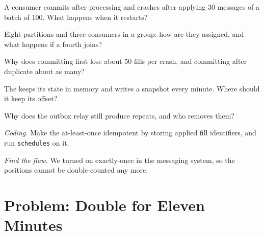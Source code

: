 \begin{exercise}[$\star$]\label{exo:pl:messaging-and-event-driven-architecture:2}
A consumer commits after processing and crashes after applying 30 messages of a batch of 100. What happens when it restarts?
\end{exercise}

\begin{exercise}[$\star$]\label{exo:pl:messaging-and-event-driven-architecture:3}
Eight partitions and three consumers in a group: how are they assigned, and what happens if a fourth joins?
\end{exercise}

\begin{exercise}[$\star\star$]\label{exo:pl:messaging-and-event-driven-architecture:4}
Why does committing first lose about 50 fills per crash, and committing after duplicate about as many?
\end{exercise}

\begin{exercise}[$\star\star$]\label{exo:pl:messaging-and-event-driven-architecture:5}
The  keeps its state in memory and writes a snapshot every minute. Where should it keep its offset?
\end{exercise}

\begin{exercise}[$\star\star$]\label{exo:pl:messaging-and-event-driven-architecture:6}
Why does the outbox relay still produce repeats, and who removes them?
\end{exercise}

\begin{exercise}[$\star\star\star$]\label{exo:pl:messaging-and-event-driven-architecture:7}
\emph{Coding.} Make the at-least-once  idempotent by storing applied fill identifiers, and run \texttt{schedules} on it.
\end{exercise}

\begin{exercise}[$\star\star\star$]\label{exo:pl:messaging-and-event-driven-architecture:8}
\emph{Find the flaw.} \textquotedbl{}We turned on exactly-once in the messaging system, so the positions cannot be double-counted any
more.\textquotedbl{}
\end{exercise}

\section{Problem: Double for Eleven Minutes}

